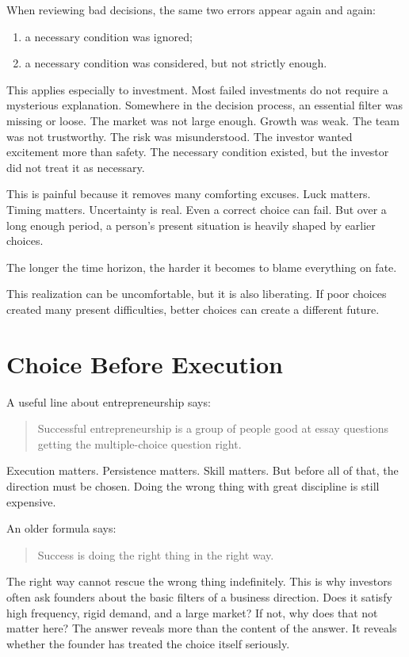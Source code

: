 When reviewing bad decisions, the same two errors appear again and again:

\begin{enumerate}
\item a necessary condition was ignored;
\item a necessary condition was considered, but not strictly enough.
\end{enumerate}

This applies especially to investment. Most failed investments do not require a mysterious explanation. Somewhere in the decision process, an essential filter was missing or loose. The market was not large enough. Growth was weak. The team was not trustworthy. The risk was misunderstood. The investor wanted excitement more than safety. The necessary condition existed, but the investor did not treat it as necessary.

This is painful because it removes many comforting excuses. Luck matters. Timing matters. Uncertainty is real. Even a correct choice can fail. But over a long enough period, a person's present situation is heavily shaped by earlier choices.

The longer the time horizon, the harder it becomes to blame everything on fate.

This realization can be uncomfortable, but it is also liberating. If poor choices created many present difficulties, better choices can create a different future.

\section*{Choice Before Execution}

A useful line about entrepreneurship says:

\begin{quote}
Successful entrepreneurship is a group of people good at essay questions getting the multiple-choice question right.
\end{quote}

Execution matters. Persistence matters. Skill matters. But before all of that, the direction must be chosen. Doing the wrong thing with great discipline is still expensive.

An older formula says:

\begin{quote}
Success is doing the right thing in the right way.
\end{quote}

The right way cannot rescue the wrong thing indefinitely. This is why investors often ask founders about the basic filters of a business direction. Does it satisfy high frequency, rigid demand, and a large market? If not, why does that not matter here? The answer reveals more than the content of the answer. It reveals whether the founder has treated the choice itself seriously.

